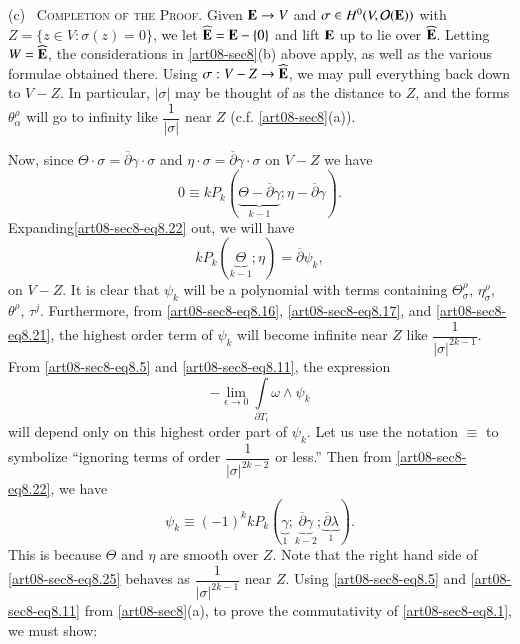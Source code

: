 (c)~ \textsc{Completion of the Proof.} Given $\mathbf{E}\to V$ and $\sigma\in H^{0}(V,\mathcal{O}(\mathbf{E}))$ with $Z=\{z\in V : \sigma(z)=0\}$, we let $\widehat{\mathbf{E}}=\mathbf{E}-\{0\}$ and lift $\mathbf{E}$ up to lie over $\widehat{\mathbf{E}}$. Letting $W=\widehat{\mathbf{E}}$, the considerations in \ref{art08-sec8}(b) above apply, as well as the various formulae obtained there. Using $\sigma:V-Z\to \widehat{\mathbf{E}}$, we may pull everything back down to $V-Z$. In particular, $|\sigma|$ may be thought of as the distance to $Z$, and the forms $\theta^{\rho}_{\alpha}$ will go to infinity like $\dfrac{1}{|\sigma|}$ near $Z$ (c.f. \ref{art08-sec8}(a)).

Now, since $\Theta\cdot \sigma =\overline{\partial}\gamma\cdot \sigma$ and $\eta\cdot \sigma=\overline{\partial}\gamma\cdot \sigma$ on $V-Z$ we have
\begin{equation}
0\equiv kP_{k}(\underbrace{\Theta-\overline{\partial}\gamma}_{k-1};\eta-\overline{\partial}\gamma).\label{art08-sec8-eq8.22}
\end{equation}
Expanding\pageoriginale \eqref{art08-sec8-eq8.22} out, we will have
\begin{equation}
kP_{k}(\underbrace{\Theta}_{k-1}; \eta)=\overline{\partial}\psi_{k},\label{art08-sec8-eq8.23}
\end{equation}
on $V-Z$. It is clear that $\psi_{k}$ will be a polynomial with terms containing $\Theta^{\rho}_{\sigma}$, $\eta^{\rho}_{\sigma}$, $\theta^{\rho}$, $\tau^{j}$. Furthermore, from \eqref{art08-sec8-eq8.16}, \eqref{art08-sec8-eq8.17}, and \eqref{art08-sec8-eq8.21}, the highest order term of $\psi_{k}$ will become infinite near $Z$ like $\dfrac{1}{|\sigma|^{2k-1}}$. From \eqref{art08-sec8-eq8.5} and \eqref{art08-sec8-eq8.11}, the expression
\begin{equation}
-\lim\limits_{\epsilon\to 0}\int\limits_{\partial T_{\epsilon}}\omega\wedge \psi_{k}\label{art08-sec8-eq8.24}
\end{equation}
will depend only on this highest order part of $\psi_{k}$. Let us use the notation $\equiv$ to symbolize ``ignoring terms of order $\dfrac{1}{|\sigma|^{2k-2}}$ or less.'' Then from \eqref{art08-sec8-eq8.22}, we have
\begin{equation}
\psi_{k}\equiv (-1)^{k}kP_{k}(\underbrace{\gamma}_{1}; \underbrace{\overline{\partial}\gamma}_{k-2}; \underbrace{\overline{\partial}\lambda}_{1}).\label{art08-sec8-eq8.25}
\end{equation}
This is because $\Theta$ and $\eta$ are smooth over $Z$. Note that the right hand side of \eqref{art08-sec8-eq8.25} behaves as $\dfrac{1}{|\sigma|^{2k-1}}$ near $Z$. Using \eqref{art08-sec8-eq8.5} and \eqref{art08-sec8-eq8.11} from \ref{art08-sec8}(a), to prove the commutativity of \eqref{art08-sec8-eq8.1}, we must show:

